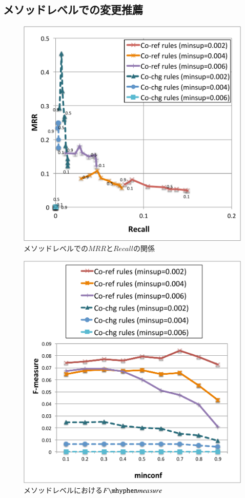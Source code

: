\documentclass[a4paper]{jsbook}
\newcommand{\fmeasure}{F\mhyphen measure}
\begin{document}
\subsection{メソッドレベルでの変更推薦}

\begin{figure}[p]
  \centering
  \includegraphics[width = 0.95\linewidth]{resource/mrgraph_m.pdf}
  \caption{メソッドレベルでの$MRR$と$Recall$の関係}
  \label{m_mrgraph}
\end{figure}
\begin{figure}[p]
  \centering
  \includegraphics[width = 0.95\linewidth]{resource/fmeasure_m.pdf}
  \caption{メソッドレベルにおける$\fmeasure$}
  \label{m_fmeasure}
\end{figure}
\end{document}

